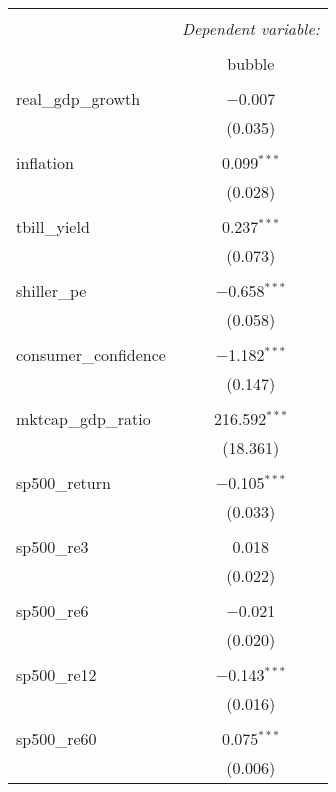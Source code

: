 
\begin{table}[!htbp] \centering 
  \caption{} 
  \label{} 
\begin{tabular}{@{\extracolsep{5pt}}lc} 
\\[-1.8ex]\hline 
\hline \\[-1.8ex] 
 & \multicolumn{1}{c}{\textit{Dependent variable:}} \\ 
\cline{2-2} 
\\[-1.8ex] & bubble \\ 
\hline \\[-1.8ex] 
 real\_gdp\_growth & $-$0.007 \\ 
  & (0.035) \\ 
  & \\ 
 inflation & 0.099$^{***}$ \\ 
  & (0.028) \\ 
  & \\ 
 tbill\_yield & 0.237$^{***}$ \\ 
  & (0.073) \\ 
  & \\ 
 shiller\_pe & $-$0.658$^{***}$ \\ 
  & (0.058) \\ 
  & \\ 
 consumer\_confidence & $-$1.182$^{***}$ \\ 
  & (0.147) \\ 
  & \\ 
 mktcap\_gdp\_ratio & 216.592$^{***}$ \\ 
  & (18.361) \\ 
  & \\ 
 sp500\_return & $-$0.105$^{***}$ \\ 
  & (0.033) \\ 
  & \\ 
 sp500\_re3 & 0.018 \\ 
  & (0.022) \\ 
  & \\ 
 sp500\_re6 & $-$0.021 \\ 
  & (0.020) \\ 
  & \\ 
 sp500\_re12 & $-$0.143$^{***}$ \\ 
  & (0.016) \\ 
  & \\ 
 sp500\_re60 & 0.075$^{***}$ \\ 
  & (0.006) \\ 

\end{tabular}
\end{table}
